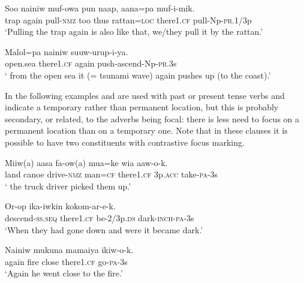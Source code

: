 \ea%
\label{ex:3:x1197}
\gll Soo nainiw muf-owa pun naap, aana=pa  muf-i-mik. \\
trap again pull-\textsc{nmz} too thus rattan=\textsc{loc} there1.\textsc{cf} pull-Np-\textsc{pr}.1/3p\\
\glt`Pulling the trap again is also like that, we/they pull it  by the rattan.'
\z

\ea%
\label{ex:3:x1198}
\gll Malol=pa  nainiw suuw-urup-i-ya. \\
open.sea there1.\textsc{cf} again push-ascend-Np-\textsc{pr}.3s\\
\glt` from the open sea it (= tsunami wave) again pushes up (to the coast).'
\z

In the following examples  and are used with past or present tense verbs and indicate a temporary rather than permanent location, but this is probably secondary, or related, to the adverbs being focal: there is less need to focus on a permanent location than on a temporary one. Note that in these clauses it is possible to have two constituents with contrastive focus marking.

\ea%
\label{ex:3:x1146}
\gll Miiw(a) aasa fa-ow(a) mua=ke  wia aaw-o-k. \\
land canoe drive-\textsc{nmz} man=\textsc{cf} there1.\textsc{cf} 3p.\textsc{acc} take-\textsc{pa}-3s\\
\glt` the truck driver picked them up.'
\z

\ea%
\label{ex:3:x1199}
\gll Or-op  ika-iwkin kokom-ar-e-k. \\
descend-\textsc{ss}.\textsc{seq} there1.\textsc{cf} be-2/3p.\textsc{ds} dark-\textsc{inch}-\textsc{pa}-3s\\
\glt`When they had gone down and were  it became dark.'
\z

\ea%
\label{ex:3:x1200}
\gll Nainiw mukuna mamaiya  ikiw-o-k. \\
again fire close there1.\textsc{cf} go-\textsc{pa}-3s\\
\glt`Again he went  close to the fire.'
\z

